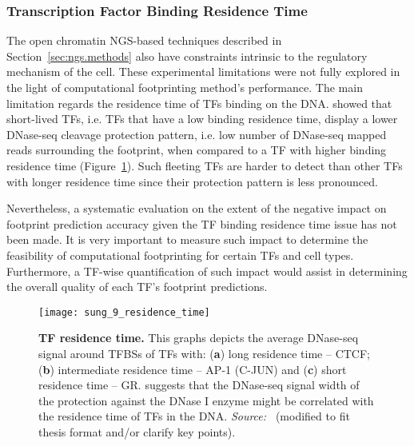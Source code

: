 \subsubsection{Transcription Factor Binding Residence Time}

The open chromatin NGS-based techniques described in Section~\ref{sec:ngs.methods} also have constraints intrinsic to the regulatory mechanism of the cell. These experimental limitations were not fully explored in the light of computational footprinting method's performance. The main limitation regards the residence time of TFs binding on the DNA. \cite{sung2014} showed that short-lived TFs, i.e. TFs that have a low binding residence time, display a lower DNase-seq cleavage protection pattern, i.e. low number of DNase-seq mapped reads surrounding the footprint, when compared to a TF with higher binding residence time (Figure~\ref{fig:sung_residence_time}). Such fleeting TFs are harder to detect than other TFs with longer residence time since their protection pattern is less pronounced.

Nevertheless, a systematic evaluation on the extent of the negative impact on footprint prediction accuracy given the TF binding residence time issue has not been made. It is very important to measure such impact to determine the feasibility of computational footprinting for certain TFs and cell types. Furthermore, a TF-wise quantification of such impact would assist in determining the overall quality of each TF's footprint predictions.

\begin{figure}[h!]
\centering
\texttt{[image: sung\_9\_residence\_time]}
\caption[TF residence time]{\textbf{TF residence time.} This graphs depicts the average DNase-seq signal around TFBSs of TFs with: (\textbf{a}) long residence time -- CTCF; (\textbf{b}) intermediate residence time -- AP-1 (C-JUN) and (\textbf{c}) short residence time -- GR. \cite{sung2014} suggests that the DNase-seq signal width of the protection against the DNase I enzyme might be correlated with the residence time of TFs in the DNA. \emph{Source:~\cite{sung2014}} (modified to fit thesis format and/or clarify key points).}
\label{fig:sung_residence_time}
\end{figure}

